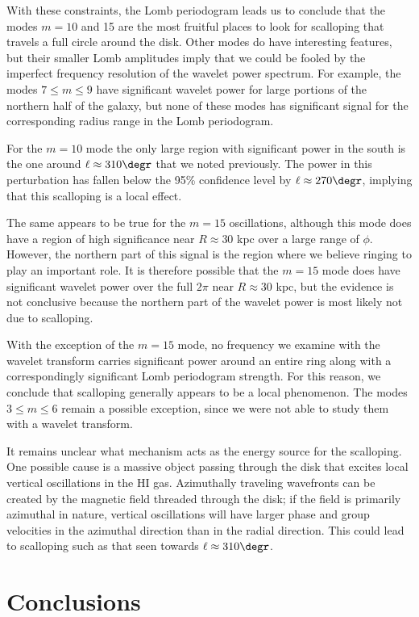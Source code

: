 \documentclass[apj]{emulateapj}
\begin{document}
 With these constraints, the Lomb periodogram leads us to conclude that the modes $m=10$ and 15 are the most fruitful places to look for scalloping that travels a full circle around the disk. Other modes do have interesting features, but their smaller Lomb amplitudes imply that we could be fooled by the imperfect frequency resolution of the wavelet power spectrum. For example, the modes $7\le m\le9$ have significant wavelet power for large portions of the northern half of the galaxy, but none of these modes has significant signal for the corresponding radius range in the Lomb periodogram.
 

For the $m=10$ mode the only large region with significant power in the south is the one around $\ell\approx310\degr$ that we noted previously. The power in this perturbation has fallen below the 95\% confidence level by $\ell\approx270\degr$, implying that this scalloping is a local effect. 

The same appears to be true for the $m=15$ oscillations, although this mode does have a region of high significance near $R\approx30$ kpc over a large range of $\phi$. However, the northern part of this signal is the region where we believe ringing to play an important role. It is therefore possible that the $m=15$ mode does have significant wavelet power over the full $2\pi$ near $R\approx 30$ kpc, but the evidence is not conclusive because the northern part of the wavelet power is most likely not due to scalloping. 
 
 With the exception of the $m=15$ mode, no frequency we examine with the wavelet transform carries significant power around an entire ring along with a correspondingly significant Lomb periodogram strength. For this reason, we conclude that  scalloping generally appears to be a local phenomenon. The modes $3\le m \le 6$ remain a possible exception, since we were not able to study them with a wavelet transform.
 
 
 It remains unclear what mechanism acts as the energy source for the scalloping. One possible cause is a massive object passing through the disk that excites local vertical oscillations in the HI gas.  Azimuthally traveling wavefronts can be created by the  magnetic field threaded through the disk; if the field is primarily azimuthal in nature, vertical oscillations will have larger phase and group velocities in the azimuthal direction than in the radial direction. This could lead to scalloping such as that seen towards $\ell\approx 310\degr$.
  
\section{Conclusions}
\end{document}

